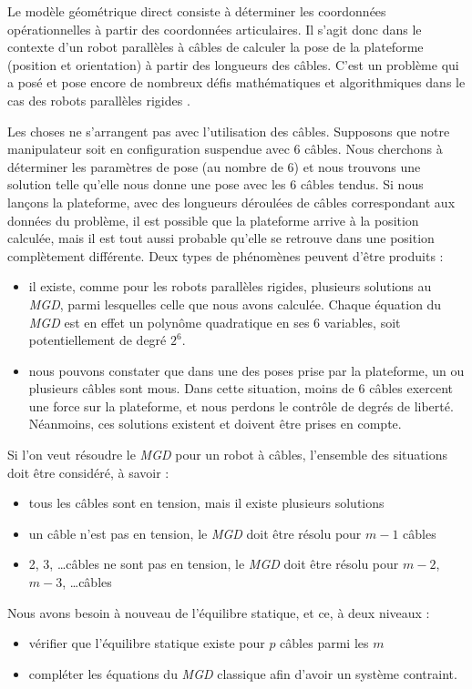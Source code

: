 Le modèle géométrique direct consiste à déterminer les coordonnées opérationnelles à partir des coordonnées articulaires. Il s'agit donc dans le contexte d'un robot parallèles à câbles de calculer la pose de la plateforme (position et orientation) à partir des longueurs des câbles. C'est un problème qui a posé et pose encore de nombreux défis mathématiques et algorithmiques dans le cas des robots parallèles rigides \cite{merlet1997robots}.

Les choses ne s'arrangent pas avec l'utilisation des câbles. Supposons que notre manipulateur soit en configuration suspendue avec 6 câbles. Nous cherchons à déterminer les paramètres de pose (au nombre de 6) et nous trouvons une solution telle qu'elle nous donne une pose avec les 6 câbles tendus. Si nous lançons la plateforme, avec des longueurs déroulées de câbles correspondant aux données du problème, il est possible que la plateforme arrive à la position calculée, mais il est tout aussi probable qu'elle se retrouve dans une position complètement différente. Deux types de phénomènes peuvent d'être produits :
\begin{itemize}
 \item il existe, comme pour les robots parallèles rigides, plusieurs solutions au {\it MGD}, parmi lesquelles celle que nous avons calculée. Chaque équation du {\it MGD} est en effet un polynôme quadratique en ses $6$ variables, soit potentiellement de degré $2^6$. 
 \item nous pouvons constater que dans une des poses prise par la plateforme, un ou plusieurs câbles sont mous. Dans cette situation, moins de 6 câbles exercent une force sur la plateforme, et nous perdons le contrôle de degrés de liberté. Néanmoins, ces solutions existent et doivent être prises en compte.
\end{itemize}

Si l'on veut résoudre le {\it MGD} pour un robot à câbles, l'ensemble des situations doit être considéré, à savoir :
\begin{itemize}
 \item tous les câbles sont en tension, mais il existe plusieurs solutions
 \item un câble n'est pas en tension, le {\it MGD} doit être résolu pour $m-1$ câbles
 \item 2, 3, \dots câbles ne sont pas en tension, le {\it MGD} doit être résolu pour $m-2$, $m-3$, \dots câbles
\end{itemize}

Nous avons besoin à nouveau de l'équilibre statique, et ce, à deux niveaux :
\begin{itemize}
 \item vérifier que l'équilibre statique existe pour $p$ câbles parmi les $m$
 \item compléter les équations du {\it MGD} classique afin d'avoir un système contraint.
\end{itemize}

